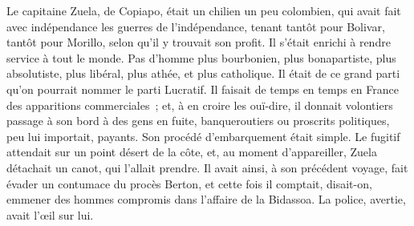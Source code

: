 \documentclass[french,twoside]{book} %
\begin{document}
Le capitaine Zuela, de Copiapo, était un chilien un peu colombien, qui avait fait avec indépendance les guerres de l’indépendance, tenant tantôt pour  Bolivar, tantôt pour Morillo, selon qu’il y trouvait son profit. Il s’était enrichi à rendre service à tout le monde. Pas d’homme plus bourbonien, plus bonapartiste, plus absolutiste, plus libéral, plus athée, et plus catholique. Il était de ce grand parti qu’on pourrait nommer le parti Lucratif. Il faisait de temps en temps en France des apparitions commerciales ; et, à en croire les ouï-dire, il donnait volontiers passage à son bord à des gens en fuite, banqueroutiers ou proscrits politiques, peu lui importait, payants. Son procédé d’embarquement était simple. Le fugitif attendait sur un point désert de la côte, et, au moment d’appareiller, Zuela détachait un canot, qui l’allait prendre. Il avait ainsi, à son précédent voyage, fait évader un contumace du procès Berton, et cette fois il comptait, disait-on, emmener des hommes compromis dans l’affaire de la Bidassoa. La police, avertie, avait l’œil sur lui.\par
\end{document}
